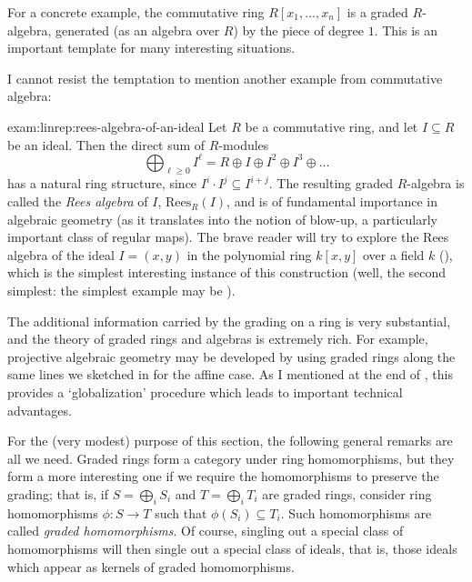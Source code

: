 For a concrete example, the commutative ring $R[x_1, \dots, x_n]$ is a
graded $R$-algebra, generated (as an algebra over $R$) by the piece of
degree $1$. This is an important template for many interesting
situations.

I cannot resist the temptation to mention another example from
commutative algebra:
\begin{exam}{}{exam:linrep:rees-algebra-of-an-ideal}
  Let $R$ be a commutative ring, and let $I \subseteq R$ be an ideal.
  Then the direct sum of $R$-modules
  \[
    \bigoplus_{\ell \geq 0} I^\ell = R \oplus I \oplus I^2 \oplus I^3
    \oplus \dots
  \]
  has a natural ring structure, since
  $I^i \cdot I^j \subseteq I^{i+j}$. The resulting graded $R$-algebra
  is called the \emph{Rees algebra} of $I$, $\mathrm{Rees}_R(I)$, and
  is of fundamental importance in algebraic geometry (as it translates
  into the notion of blow-up, a particularly important class of
  regular maps). The brave reader will try to explore the Rees algebra
  of the ideal $I = (x, y)$ in the polynomial ring $k[x, y]$ over a
  field $k$ (),
  which is the simplest interesting instance of this construction
  (well, the second simplest: the simplest example may be
  ).
\end{exam}

The additional information carried by the grading on a ring is very
substantial, and the theory of graded rings and algebras is extremely
rich. For example, projective algebraic geometry may be developed by
using graded rings along the same lines we sketched in
 for the
affine case. As I mentioned at the end of
, this
provides a `globalization' procedure which leads to important
technical advantages.

For the (very modest) purpose of this section, the following general
remarks are all we need.  Graded rings form a category under ring
homomorphisms, but they form a more interesting one if we require the
homomorphisms to preserve the grading; that is, if
$S = \bigoplus_i S_i$ and $T = \bigoplus_i T_i$ are graded rings,
consider ring homomorphisms $\phi : S \to T$ such that
$\phi(S_i) \subseteq T_i$. Such homomorphisms are called \emph{graded
  homomorphisms}. Of course, singling out a special class of
homomorphisms will then single out a special class of ideals, that is,
those ideals which appear as kernels of graded homomorphisms.

